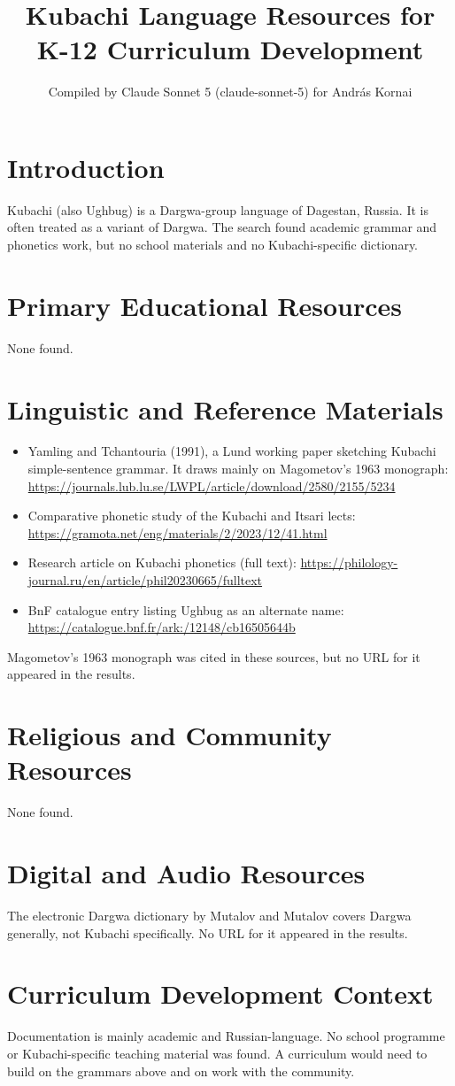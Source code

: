 \documentclass[12pt]{article}
\title{Kubachi Language Resources for K-12 Curriculum Development}
\author{Compiled by Claude Sonnet 5 (claude-sonnet-5) for Andr\'as Kornai}
\date{}
\begin{document}
\maketitle
\section{Introduction}
Kubachi (also Ughbug) is a Dargwa-group language of Dagestan, Russia. It is often treated as a variant of Dargwa. The search found academic grammar and phonetics work, but no school materials and no Kubachi-specific dictionary.
\section{Primary Educational Resources}
None found.
\section{Linguistic and Reference Materials}
\begin{itemize}
\item Yamling and Tchantouria (1991), a Lund working paper sketching Kubachi simple-sentence grammar. It draws mainly on Magometov's 1963 monograph: \url{https://journals.lub.lu.se/LWPL/article/download/2580/2155/5234}
\item Comparative phonetic study of the Kubachi and Itsari lects: \url{https://gramota.net/eng/materials/2/2023/12/41.html}
\item Research article on Kubachi phonetics (full text): \url{https://philology-journal.ru/en/article/phil20230665/fulltext}
\item BnF catalogue entry listing Ughbug as an alternate name: \url{https://catalogue.bnf.fr/ark:/12148/cb16505644b}
\end{itemize}
Magometov's 1963 monograph was cited in these sources, but no URL for it appeared in the results.
\section{Religious and Community Resources}
None found.
\section{Digital and Audio Resources}
The electronic Dargwa dictionary by Mutalov and Mutalov covers Dargwa generally, not Kubachi specifically. No URL for it appeared in the results.
\section{Curriculum Development Context}
Documentation is mainly academic and Russian-language. No school programme or Kubachi-specific teaching material was found. A curriculum would need to build on the grammars above and on work with the community.
\end{document}
